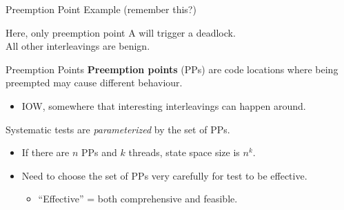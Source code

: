 \documentclass[xcolor=dvipsnames]{beamer}
\begin{document}
\begin{frame}{Preemption Point Example (remember this?)}
	\linegap

	Here, only preemption point A will trigger a deadlock. {\bf ~}\\
	All other interleavings are benign.{\bf ~}

\end{frame}

\begin{frame}{Preemption Points}
	\textbf{Preemption points} (PPs) are code locations where being preempted may cause different behaviour.
	\begin{itemize}
		\item IOW, somewhere that interesting interleavings can happen around.
	\end{itemize}
	\linegap

	Systematic tests are {\em parameterized} by the set of PPs.
	\begin{itemize}
		\item If there are $n$ PPs and $k$ threads, state space size is $n^k$.
		\item Need to choose the set of PPs very carefully for test to be effective.
		\begin{itemize}
			\item ``Effective'' = both comprehensive and feasible.
		\end{itemize}
	\end{itemize}
\end{frame}
\end{document}
